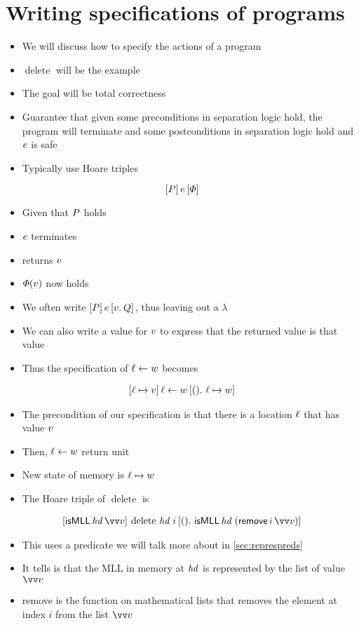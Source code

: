 \documentclass[thesis.tex]{subfiles}
\begin{document}
\section{Writing specifications of programs}
\label{sec:Hoare}
\begin{itemize}
  \item We will discuss how to specify the actions of a program
  \item $\operatorname{delete}$ will be the example
  \item The goal will be total correctness
  \item Guarantee that given some preconditions in separation logic hold, the program will terminate and some postconditions in separation logic hold and $e$ is safe
  \item Typically use Hoare triples
\end{itemize}
\[\hoare{\prop}{\expr}{\pred}\]
\begin{itemize}
  \item Given that $P$ holds
  \item $e$ terminates
  \item returns $v$
  \item $\varPhi(v)$ now holds
  \item We often write $\hoare{\prop}{\expr}{\Ret\val. \propB}$, thus leaving out a $\lambda$
  \item We can also write a value for $v$ to express that the returned value is that value
  \item Thus the specification of $\ell\leftarrow w$ becomes
\end{itemize}
\begin{align*}
  \hoare{\loc\fmapsto\val}{\loc\gets\valB}{().\ \loc\fmapsto\valB}
\end{align*}
\begin{itemize}
  \item The precondition of our specification is that there is a location $\ell$ that has value $v$
  \item Then, $\ell\leftarrow w$ return unit
  \item New state of memory is $\loc\fmapsto\valB$
  \item The Hoare triple of $\operatorname{delete}$ is
\end{itemize}
\begin{align*}
  \hoare{\textlog{isMLL}\, \langv{hd}\, \vect{\val}}{\operatorname{delete}\, \langv{hd}\; i }{().\ \textlog{isMLL}\, \langv{hd}\; (\textlog{remove}\, i\, \vect{v})}
\end{align*}
\begin{itemize}
  \item This uses a predicate we will talk more about in \cref*{sec:represpreds}
  \item It tells is that the MLL in memory at $\mathit{hd}$ is represented by the list of value $\vect{v}$
  \item remove is the function on mathematical lists that removes the element at index $i$ from the list $\vect{v}$
\end{itemize}
\end{document}
